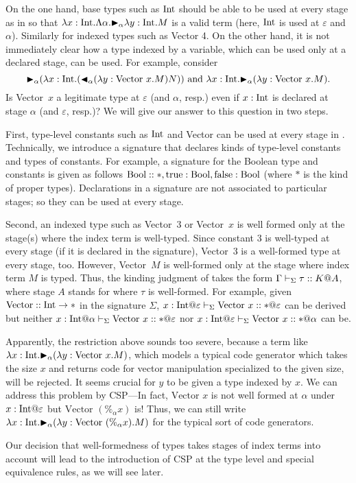 On the one hand, base types such as \(\textrm{Int}\) should be able to be used
at every stage as in \LTP so that
\(\lambda x:\textrm{Int}.\Lambda \alpha. {\mathop{\blacktriangleright}}_\alpha \lambda y:\textrm{Int}.M\) is a valid
term (here, \(\textrm{Int}\) is used at \(\varepsilon\) and \(\alpha\)).
Similarly for indexed types such as Vector 4.  On the other hand, it
is not immediately clear how a type indexed by a variable, which can be used only
at a declared stage, can be used.  For example,
consider
\[{\mathop{\blacktriangleright}}_\alpha (\lambda x:\textrm{Int}. ({\mathop{\blacktriangleleft}}_\alpha (\lambda y:\text{Vector
  }x.M)N) )
  \text{ and }
  \lambda x:\textrm{Int}. {\mathop{\blacktriangleright}}_\alpha (\lambda y:\text{Vector }x.M).
\]
Is Vector\ \(x\) a legitimate type at \(\varepsilon\) (and \(\alpha\),
resp.)  even if \(x:\textrm{Int}\) is declared at stage \(\alpha\) (and
\(\varepsilon\), resp.)?  We will give our answer to this question in two
steps.

First, type-level constants such as \(\textrm{Int}\) and Vector can be used at
every stage in \LMD.  Technically, we introduce a signature that
declares kinds of type-level constants and types of constants.  For
example, a signature for the Boolean type and constants is given as
follows $\textrm{Bool}::*, \text{true}:\textrm{Bool}, \text{false}:\textrm{Bool}$ (where $*$ is the
kind of proper types).  Declarations in a signature are not
associated to particular stages; so they can be used at every stage.

Second, an indexed type such as Vector\ 3 or Vector\ $x$ is well
formed only at the stage(s) where the index term is well-typed.  Since
constant \(3\) is well-typed at every stage (if it is declared in the
signature), Vector\ 3 is a well-formed type at every stage, too.
However, Vector\ $M$ is well-formed only at the stage where index term
$M$ is typed.  Thus, the kinding judgment
of \LMD takes the form \(\Gamma\vdash_\Sigma \tau :: K @ A\), where stage $A$ stands for
where \(\tau\) is well-formed.  For example,
given \(\text{Vector}:: \textrm{Int} \rightarrow *\) in the signature \(\Sigma\),
\(x:\I@\varepsilon \V \text{Vector }x :: * @\varepsilon\) can be
derived but
neither
\(x:\I@\alpha \V \text{Vector }x :: * @\varepsilon\)
nor 
\(x:\I@\varepsilon \V \text{Vector }x :: * @\alpha\)
can be.

Apparently, the restriction above sounds too severe, because a term like
\(\lambda x:\textrm{Int}. {\mathop{\blacktriangleright}}_\alpha (\lambda y:\text{Vector }x.M) \), which models a
typical code generator which takes the size $x$ and returns code for vector
manipulation specialized to the given size, will be rejected. It seems crucial
for \(y\) to be given a type indexed by $x$. We can address this problem by
CSP---In fact, $\text{Vector }x$ is not well formed at $\alpha$ under
$x:\I@\varepsilon$ but $\text{Vector }(\%_\alpha x)$ is!  Thus, we can still
write \(\lambda x:\textrm{Int}. {\mathop{\blacktriangleright}}_\alpha (\lambda y:\text{Vector }(\%_\alpha x).M) \)
for the typical sort of code generators.

Our decision that well-formedness of types takes stages of index terms
into account will lead to the introduction of CSP at the type level
and special equivalence rules, as we will see later.
